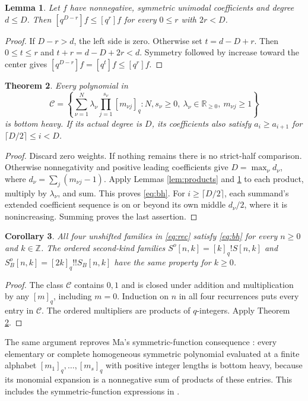 \documentclass[11pt]{article}
\newtheorem{lemma}{Lemma}
\newtheorem{theorem}[lemma]{Theorem}
\newtheorem{corollary}[lemma]{Corollary}
\newcommand{\qi}[1]{[#1]_q}
\newcommand{\coef}[2]{[q^{#1}]#2}
\begin{document}
\begin{lemma}\label{lem:ambient}
Let $f$ have nonnegative, symmetric unimodal coefficients and degree
$d\le D$. Then $\coef{D-r}{f}\le\coef r f$ for every $0\le r$ with
$2r<D$.
\end{lemma}
\begin{proof}
If $D-r>d$, the left side is zero. Otherwise set $t=d-D+r$.
Then $0\le t\le r$ and $t+r=d-D+2r<d$. Symmetry followed by
increase toward the center gives
$\coef{D-r}{f}=\coef t f\le\coef r f$.
\end{proof}

\begin{theorem}\label{thm:closure}
Every polynomial in
\[
 \mathcal C=\left\{\sum_{\nu=1}^{N}\lambda_\nu
       \prod_{j=1}^{s_\nu}\qi{m_{\nu j}}:
       N,s_\nu\ge0,\ \lambda_\nu\in\mathbb R_{\ge0},\ m_{\nu j}\ge1\right\}
\]
is bottom heavy. If its actual degree is $D$, its coefficients also
satisfy $a_i\ge a_{i+1}$ for $\lceil D/2\rceil\le i<D$.
\end{theorem}
\begin{proof}
Discard zero weights. If nothing remains there is no strict-half
comparison. Otherwise nonnegativity and positive leading coefficients
give $D=\max_\nu d_\nu$, where $d_\nu=\sum_j(m_{\nu j}-1)$.
Apply Lemmas \ref{lem:products} and \ref{lem:ambient} to each product,
multiply by $\lambda_\nu$, and sum. This proves \eqref{eq:bh}.
For $i\ge\lceil D/2\rceil$, each summand's extended coefficient
sequence is on or beyond its own middle $d_\nu/2$, where it is
nonincreasing. Summing proves the last assertion.
\end{proof}

\begin{corollary}\label{cor:stirling}
All four unshifted families in \eqref{eq:rec} satisfy \eqref{eq:bh}
for every $n\ge0$ and $k\in\mathbb Z$.
The ordered second-kind families
$S^o[n,k]=\qi{k}!S[n,k]$ and
$S_B^o[n,k]=\qi{2k}!!S_B[n,k]$ have the same property for $k\ge0$.
\end{corollary}
\begin{proof}
The class $\mathcal C$ contains $0,1$ and is closed under addition
and multiplication by any $\qi m$, including $m=0$.
Induction on $n$ in all four recurrences puts every entry in
$\mathcal C$. The ordered multipliers are products of $q$-integers.
Apply Theorem \ref{thm:closure}.
\end{proof}

The same argument reproves Ma's symmetric-function consequence
\cite[Proposition 1]{Ma}: every elementary or complete homogeneous
symmetric polynomial evaluated at a finite alphabet
$\qi{m_1},\ldots,\qi{m_s}$ with positive integer lengths is bottom heavy,
because its monomial expansion is a nonnegative sum of products of these
entries. This includes the symmetric-function expressions in
\cite[Theorem 2.1]{SS}.
\end{document}
